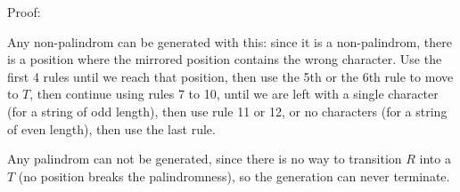 Proof:

Any non-palindrom can be generated with this: since it is a non-palindrom, there is a position where the mirrored position contains the wrong character. Use the first 4 rules until we reach that position, then use the 5th or the 6th rule to move to $T$, then continue using rules 7 to 10, until we are left with a single character (for a string of odd length), then use rule 11 or 12, or no characters (for a string of even length), then use the last rule.

Any palindrom can not be generated, since there is no way to transition $R$ into a $T$ (no position breaks the palindromness), so the generation can never terminate.
